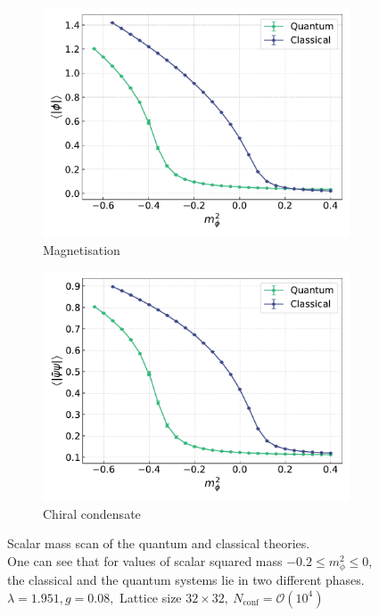 \begin{figure}[h]
    \centering
    \captionsetup[subfigure]{justification=centering}
    \begin{subfigure}[t]{0.47\textwidth}
        \centering
        \includegraphics[width=1.0\textwidth]{figures/chiral_PT/mass_scan/magnetisation.pdf}
        \caption{Magnetisation}
    \end{subfigure}
    \hfill
    \begin{subfigure}[t]{0.47\textwidth}
        \centering
        \includegraphics[width=1.0\textwidth]{figures/chiral_PT/mass_scan/condensate.pdf}
        \caption{Chiral condensate}
    \end{subfigure}
    \caption[Scalar mass scan of the quantum and classical theories]{Scalar mass scan of the quantum and classical theories. \\ One can see that for values of scalar squared mass $-0.2 \leq m_\phi^2 \leq 0$, the classical and the quantum systems lie in two different phases. \\
    $\lambda=1.951, g=0.08,$ Lattice size $32 \times 32, \ N_\text{conf} = \mathcal{O}(10^4)$}
    \label{fig:scans_classical_quantum}
\end{figure} \\
